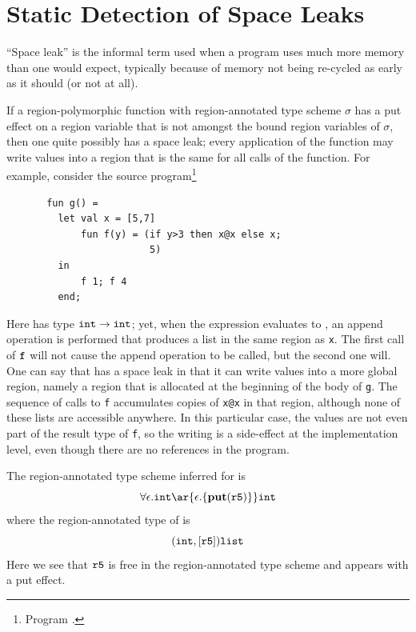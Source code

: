 \documentclass[12pt]{book}
\begin{document}
\chapter{Static Detection of Space Leaks}
\label{spaceleak.sec}

``Space leak'' is the informal term used when a program uses much
more memory than one would expect, typically because of memory not
being re-cycled as early as it should (or not at all).

If a region-polymorphic function with region-annotated type scheme $\sigma$
has a put effect on a region variable 
that is not amongst the bound region variables of $\sigma$, then
one quite possibly has a space leak; every application of the
function may write values into a region that is the same for
all calls of the function. For example, consider the 
source program\footnote{Program .}
\begin{verbatim}
       fun g() = 
         let val x = [5,7]
             fun f(y) = (if y>3 then x@x else x; 
                         5)
         in 
             f 1; f 4
         end;
\end{verbatim} 
Here  has type $\hbox{\tt int}\to\hbox{\tt int}$; yet, when the expression  evaluates
to , an append operation is performed that produces a list in the same region
as {\tt x}. The first call of $\hbox{\tt f}$ will not cause the
append operation to be called, but the second one will. One can say that
 has a space leak in that it can write values into a more
global region, namely a region that is allocated at the beginning of
the body of {\tt g}. The sequence of calls to {\tt f}
accumulates copies of {\tt x@x} in that region, although none of these
lists are accessible anywhere.
In this particular case, the values are not even part of 
the result type of {\tt f}, 
so the writing is a side-effect at the implementation level,
even though there are no references in the program.

The region-annotated type scheme inferred for  is
$$\forall\epsilon.\boxml{int} \ar{\epsilon.\{\Put(\mathtt{r5})\}} \boxml{int}$$
where the region-annotated type of  is
$$(\hbox{\tt int},[\hbox{\tt r5}])\hbox{\tt list}$$
Here we see that $\hbox{\tt r5}$ is free in the region-annotated type scheme and appears with a put effect.
\end{document}
